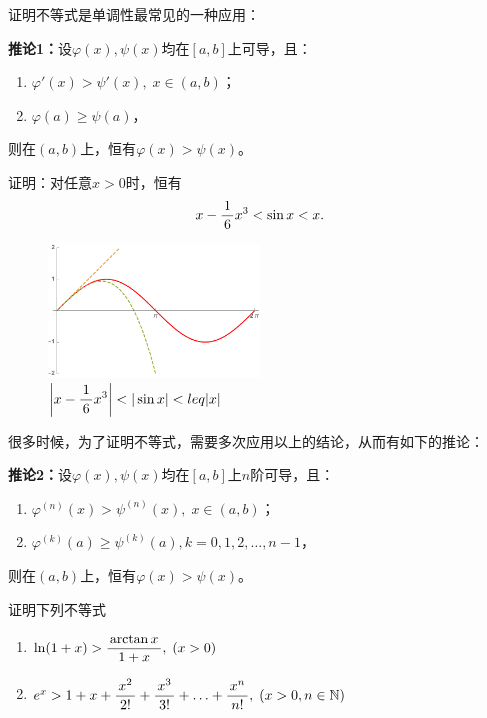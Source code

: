 证明不等式是单调性最常见的一种应用：

\begin{thx}
	{\bf 推论1：}设$\varphi(x),\psi(x) $均在$[a,b]$上可导，且：
	\begin{enumerate}[(1)]
	  \item $\varphi'(x)>\psi'(x),\;x\in(a,b)$；
	  \item $\varphi(a)\geq\psi(a)$，
	\end{enumerate}
	则在$(a,b)$上，恒有$\varphi(x)>\psi(x)$。
\end{thx}

\egz 证明：对任意$x>0$时，恒有
$$x-\displaystyle\frac{\,{1}\,}{\,{6}\,}x^3<\sin x<x.$$
	
\begin{figure}[h]
	\centering
	\includegraphics[width=0.5\textwidth]
	{./Images/Ch03/xSinxx3.pdf}
	\caption{$\left|x-\df 16x^3\right|<|\sin x|<leq|x|$}
	\label{fig:xSinxx3}
\end{figure}

很多时候，为了证明不等式，需要多次应用以上的结论，从而有如下的推论：

\begin{thx}
	{\bf 推论2：}设$\varphi(x),\psi(x) $均在$[a,b]$上$n$阶可导，且：
	\begin{enumerate}[(1)]
	  \item $\varphi^{(n)}(x)>\psi^{(n)}(x),\;x\in(a,b)$；
	  \item $\varphi^{(k)}(a)\geq\psi^{(k)}(a),k=0,1,2,\ldots,n-1$，
	\end{enumerate}
	则在$(a,b)$上，恒有$\varphi(x)>\psi(x)$。
\end{thx}


\egz 证明下列不等式
\begin{enumerate}[(1)]
  \setlength{\itemindent}{1cm}
  \item $\ln(1+x)>\displaystyle\frac{\,{\arctan x}\,}{\,{1+x}\,},\;(x>0)$
  \item $e^x>1+x+\displaystyle\frac{\,{x^2}\,}{\,{2!}\,}+\displaystyle\frac{\,{x^3}\,}{\,{3!}\,}+\ldots+\displaystyle\frac{\,{x^n}\,}{\,{n!}\,},\;(x>0,n\in\mathbb{N})$
\end{enumerate}

